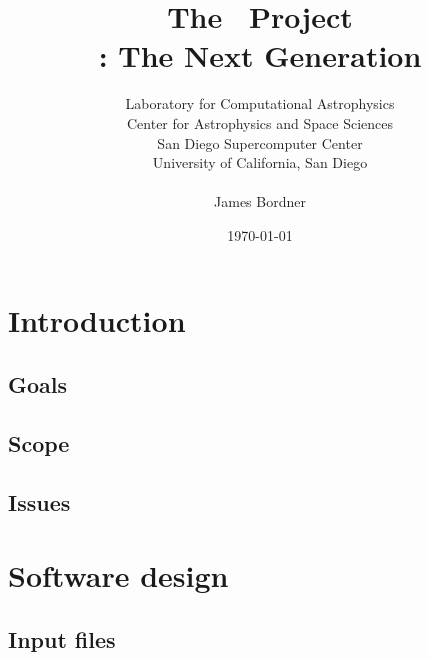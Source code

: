 \documentclass{beamer}
\title[The \cello\ Project]
      {The \cello\ Project \\ \small{\enzo: The Next Generation}}
\author[James Bordner]{\small Laboratory for Computational Astrophysics \\ Center for Astrophysics and Space Sciences \\San Diego Supercomputer Center \\ University of California, San Diego \\ \ \\ James Bordner}
\date{\today}
\begin{document}
\frame{\titlepage}


\section{Introduction}

% 

\subsection{Goals}



\subsection{Scope}




\subsection{Issues}



\section{Software design}

\subsection{Input files}
\end{document}
